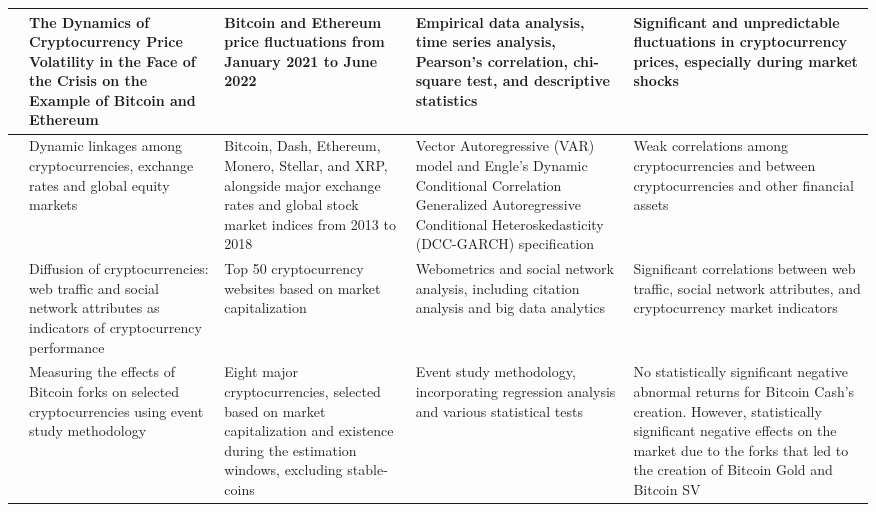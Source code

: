 \documentclass{article}
\begin{document}
\begin{longtable}{|p{2.0cm}|p{2cm}|p{2.5cm}|p{3.8cm}|p{5.0cm}|}
\cite{przyluska2023dynamics} & The Dynamics of Cryptocurrency Price Volatility in the Face of the Crisis on the Example of Bitcoin and Ethereum & Bitcoin and Ethereum price fluctuations from January 2021 to June 2022 & Empirical data analysis, time series analysis, Pearson’s correlation, chi-square test, and descriptive statistics & Significant and unpredictable fluctuations in cryptocurrency prices, especially during market shocks \\
\hline
\cite{kostika2020dynamic} & Dynamic linkages among cryptocurrencies, exchange rates and global equity markets & Bitcoin, Dash, Ethereum, Monero, Stellar, and XRP, alongside major exchange rates and global stock market indices from 2013 to 2018 & Vector Autoregressive (VAR) model and Engle’s Dynamic Conditional Correlation Generalized Autoregressive Conditional Heteroskedasticity (DCC-GARCH) specification & Weak correlations among cryptocurrencies and between cryptocurrencies and other financial assets \\
\hline
\cite{park2020diffusion} & Diffusion of cryptocurrencies: web traffic and social network attributes as indicators of cryptocurrency performance & Top 50 cryptocurrency websites based on market capitalization & Webometrics and social network analysis, including citation analysis and big data analytics & Significant correlations between web traffic, social network attributes, and cryptocurrency market indicators \\
\hline
\cite{tomic2020measuring} & Measuring the effects of Bitcoin forks on selected cryptocurrencies using event study methodology & Eight major cryptocurrencies, selected based on market capitalization and existence during the estimation windows, excluding stable-coins & Event study methodology, incorporating regression analysis and various statistical tests & No statistically significant negative abnormal returns for Bitcoin Cash's creation. However, statistically significant negative effects on the market due to the forks that led to the creation of Bitcoin Gold and Bitcoin SV \\


\end{longtable}
\end{document}
